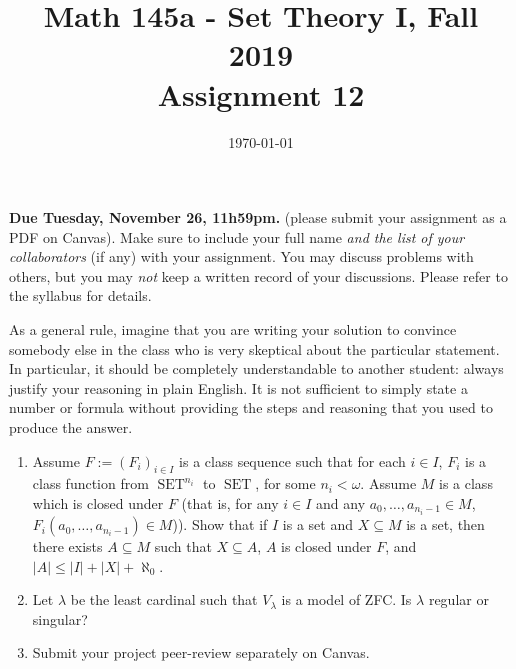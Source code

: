 \documentclass{amsart}
\title[Math 145a, Fall 2019: assignment 12]{Math 145a - Set Theory I, Fall 2019 \\ Assignment 12}
\date{\today}
\theoremstyle{definition}
\newcommand{\Set}{\operatorname{SET}}
\newcommand{\seq}[2]{\left(#1\right)_{#2}}
\begin{document}

\vspace*{-10em}

\maketitle

\textbf{Due Tuesday, November 26, 11h59pm.} (please submit your assignment as a PDF on Canvas). Make sure to include your full name \emph{and the list of your collaborators} (if any) with your assignment. You may discuss problems with others, but you may \emph{not} keep a written record of your discussions. Please refer to the syllabus for details.

As a general rule, imagine that you are writing your solution to convince somebody else in the class who is very skeptical about the particular statement. In particular, it should be completely understandable to another student: always justify your reasoning in plain English. It is not sufficient to simply state a number or formula without providing the steps and reasoning that you used to produce the answer.

\begin{enumerate}
\item   Assume $F := \seq{F_i}{i \in I}$ is a class sequence such that for each $i \in I$, $F_i$ is a class function from $\Set^{n_i}$ to $\Set$, for some $n_i < \omega$. Assume $M$ is a class which is closed under $F$ (that is, for any $i \in I$ and any $a_0, \ldots, a_{n_i - 1} \in M$, $F_i (a_0, \ldots, a_{n_i - 1}) \in M$)). Show that if $I$ is a set and $X \subseteq M$ is a set, then there exists $A \subseteq M$ such that $X \subseteq A$, $A$ is closed under $F$, and $|A| \le |I| + |X| + \aleph_0$. 
\item Let $\lambda$ be the least cardinal such that $V_\lambda$ is a model of ZFC. Is $\lambda$ regular or singular?

  
\item Submit your project peer-review separately on Canvas.
\end{enumerate}
\end{document}
